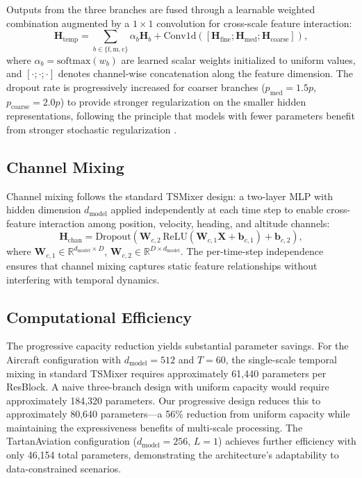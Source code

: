 \documentclass[letterpaper,journal]{IEEEtran}
\begin{document}
Outputs from the three branches are fused through a learnable weighted combination
augmented by a $1 \times 1$ convolution for cross-scale feature interaction:
\begin{equation}
\mathbf{H}_{\text{temp}} = \sum_{b \in \{\text{f},\text{m},\text{c}\}} \alpha_b \mathbf{H}_b +
\text{Conv1d}\left([\mathbf{H}_{\text{fine}}; \mathbf{H}_{\text{med}}; \mathbf{H}_{\text{coarse}}]\right),
\end{equation}
where $\alpha_b = \text{softmax}(w_b)$ are learned scalar weights initialized to uniform
values, and $[\cdot;\cdot;\cdot]$ denotes channel-wise concatenation along the feature
dimension. The dropout rate is progressively increased for coarser branches
($p_{\text{med}} = 1.5p$, $p_{\text{coarse}} = 2.0p$) to provide stronger regularization
on the smaller hidden representations, following the principle that models with fewer
parameters benefit from stronger stochastic regularization \cite{Srivastava2014Dropout}.

\subsection{Channel Mixing}
Channel mixing follows the standard TSMixer design: a two-layer MLP with hidden
dimension $d_{\text{model}}$ applied independently at each time step to enable
cross-feature interaction among position, velocity, heading, and altitude channels:
\begin{equation}
\mathbf{H}_{\text{chan}} = \text{Dropout}\left(\mathbf{W}_{c,2}\,\text{ReLU}\left(\mathbf{W}_{c,1} \mathbf{X} + \mathbf{b}_{c,1}\right) + \mathbf{b}_{c,2}\right),
\end{equation}
where $\mathbf{W}_{c,1} \in \mathbb{R}^{d_{\text{model}} \times D}$,
$\mathbf{W}_{c,2} \in \mathbb{R}^{D \times d_{\text{model}}}$. The per-time-step
independence ensures that channel mixing captures static feature relationships
without interfering with temporal dynamics.

\subsection{Computational Efficiency}
The progressive capacity reduction yields substantial parameter savings. For the
Aircraft configuration with $d_{\text{model}}=512$ and $T=60$, the single-scale
temporal mixing in standard TSMixer requires approximately 61,440 parameters per
ResBlock. A naive three-branch design with uniform capacity would require
approximately 184,320 parameters. Our progressive design reduces this to
approximately 80,640 parameters---a 56\% reduction from uniform capacity while
maintaining the expressiveness benefits of multi-scale processing. The TartanAviation
configuration ($d_{\text{model}}=256$, $L=1$) achieves further efficiency with only
46,154 total parameters, demonstrating the architecture's adaptability to
data-constrained scenarios.
\end{document}
